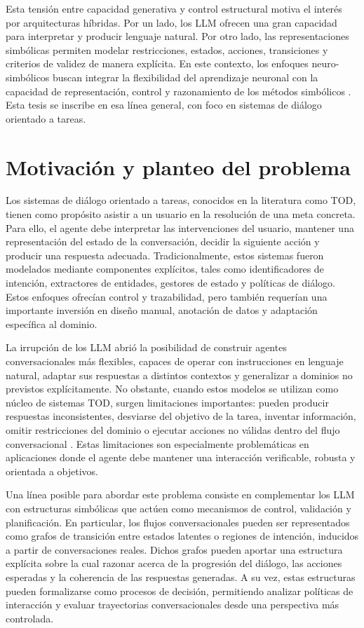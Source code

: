 Esta tensión entre capacidad generativa y control estructural motiva el interés por
arquitecturas híbridas. Por un lado, los \ac{LLM} ofrecen una gran capacidad para
interpretar y producir lenguaje natural. Por otro lado, las representaciones simbólicas
permiten modelar restricciones, estados, acciones, transiciones y criterios de validez
de manera explícita. En este contexto, los enfoques neuro-simbólicos buscan integrar
la flexibilidad del aprendizaje neuronal con la capacidad de representación, control y
razonamiento de los métodos simbólicos \citep{garcez2019neural,garcez2020neuro}.
Esta tesis se inscribe en esa línea general, con foco en sistemas de diálogo orientado
a tareas.

\section{Motivación y planteo del problema}

Los sistemas de diálogo orientado a tareas, conocidos en la literatura como \ac{TOD},
tienen como propósito asistir a un usuario en la resolución de una meta concreta. Para
ello, el agente debe interpretar las intervenciones del usuario, mantener una representación
del estado de la conversación, decidir la siguiente acción y producir una respuesta
adecuada. Tradicionalmente, estos sistemas fueron modelados mediante componentes
explícitos, tales como identificadores de intención, extractores de entidades, gestores
de estado y políticas de diálogo. Estos enfoques ofrecían control y trazabilidad, pero
también requerían una importante inversión en diseño manual, anotación de datos y
adaptación específica al dominio.

La irrupción de los \ac{LLM} abrió la posibilidad de construir agentes conversacionales
más flexibles, capaces de operar con instrucciones en lenguaje natural, adaptar sus
respuestas a distintos contextos y generalizar a dominios no previstos explícitamente.
No obstante, cuando estos modelos se utilizan como núcleo de sistemas \ac{TOD}, surgen
limitaciones importantes: pueden producir respuestas inconsistentes, desviarse del
objetivo de la tarea, inventar información, omitir restricciones del dominio o ejecutar
acciones no válidas dentro del flujo conversacional \citep{hudecek2023are,qin2023chatgpt}.
Estas limitaciones son especialmente problemáticas en aplicaciones donde el agente debe
mantener una interacción verificable, robusta y orientada a objetivos.

Una línea posible para abordar este problema consiste en complementar los \ac{LLM}
con estructuras simbólicas que actúen como mecanismos de control, validación y
planificación. En particular, los flujos conversacionales pueden ser representados como
grafos de transición entre estados latentes o regiones de intención, inducidos a partir
de conversaciones reales. Dichos grafos pueden aportar una estructura explícita sobre
la cual razonar acerca de la progresión del diálogo, las acciones esperadas y la coherencia
de las respuestas generadas. A su vez, estas estructuras pueden formalizarse como
procesos de decisión, permitiendo analizar políticas de interacción y evaluar trayectorias
conversacionales desde una perspectiva más controlada.

